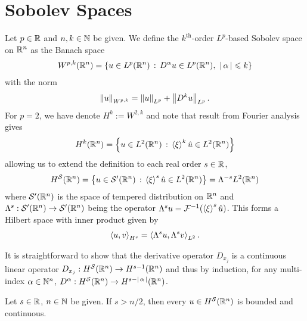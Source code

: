 \documentclass[12pt]{article}
\begin{document}
\section{Sobolev Spaces \cite[Chapter 4]{taylor_pde}}
\begin{fdefinition} Let $p \in \R$ and $n, k \in \N$ be given. We define the $k^{\text{th}}$-order $L^p$-based Sobolev space on $\R^n$ as the Banach space
    \begin{align*}
    W^{p, k}(\R^n) = \set{u \in L^p(\R^n) \wh D^\alpha u \in L^p(\R^n), \, \, \abs{\alpha} \leq k }
    \end{align*}
    with the norm
    \begin{align*}
    \norm[u]_{W^{p, k}} = \norm[u]_{L^p} + \norm[D^k u]_{L^p}. 
    \end{align*}
    For $p = 2$, we have denote $H^k := W^{2, k}$ and note that result from Fourier analysis gives
    \begin{align*}
    H^k(\R^n) = \set{u \in L^2(\R^n) \wh \abrac{\xi}^k \hat{u} \in L^2(\R^n)}
    \end{align*}
    allowing us to extend the definition to each real order $s \in \R$, 
    \begin{align*}
    H^\sch(\R^n) = \set{u \in \sch'(\R^n) \wh \abrac{\xi}^s \hat{u} \in L^2(\R^n)} = \Lambda^{-s} L^2(\R^n) 
    \end{align*}
    where $\sch'(\R^n)$ is the space of tempered distribution on $\R^n$ and $\Lambda^s: \sch'(\R^n) \to \sch'(\R^n)$ being the operator $\Lambda^su = \F^{-1}(\abrac{\xi}^s \hat{u})$. This forms a Hilbert space with inner product given by
    \begin{align*}
    \inprod[u, v]_{H^s} = \inprod[ \Lambda^su, \Lambda^sv]_{L^2}. 
    \end{align*}
\end{fdefinition}
\begin{rem}
    It is straightforward to show that the derivative operator $D_{x_j}$ is a continuous linear operator $D_{x_j}: H^\sch(\R^n) \to H^{s - 1}(\R^n)$ and thus by induction, for any multi-index $\alpha \in \N^n$, $D^{\alpha} : H^\sch(\R^n) \to H^{s - \abs{\alpha}}(\R^n)$. 
\end{rem}

\begin{fprop}
    Let $s \in \R$, $n \in \N$ be given. If $s > n /2$, then every $u \in H^\sch(\R^n)$ is bounded and continuous.     
\end{fprop}
\end{document}
